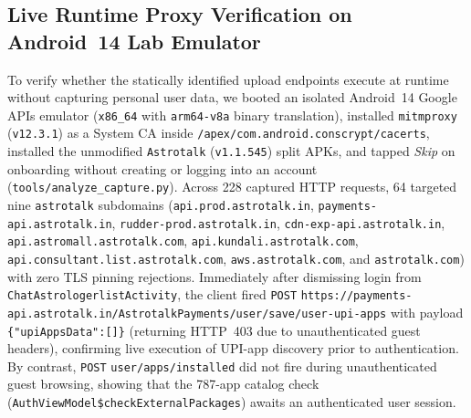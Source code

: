 \subsection{Live Runtime Proxy Verification on Android~14 Lab Emulator}
To verify whether the statically identified upload endpoints execute at runtime without capturing personal user data, we booted an isolated Android~14 Google APIs emulator (\texttt{x86\_64} with \texttt{arm64-v8a} binary translation), installed \texttt{mitmproxy} (\texttt{v12.3.1}) as a System CA inside \nolinkurl{/apex/com.android.conscrypt/cacerts}, installed the unmodified \texttt{Astrotalk} (\texttt{v1.1.545}) split APKs, and tapped \emph{Skip} on onboarding without creating or logging into an account (\nolinkurl{tools/analyze_capture.py}). Across 228 captured HTTP requests, 64 targeted nine \texttt{astrotalk} subdomains (\nolinkurl{api.prod.astrotalk.in}, \nolinkurl{payments-api.astrotalk.in}, \nolinkurl{rudder-prod.astrotalk.in}, \nolinkurl{cdn-exp-api.astrotalk.in}, \nolinkurl{api.astromall.astrotalk.com}, \nolinkurl{api.kundali.astrotalk.com}, \nolinkurl{api.consultant.list.astrotalk.com}, \nolinkurl{aws.astrotalk.com}, and \nolinkurl{astrotalk.com}) with zero TLS pinning rejections. Immediately after dismissing login from \texttt{ChatAstrologer\allowbreak listActivity}, the client fired \texttt{POST} \nolinkurl{https://payments-api.astrotalk.in/AstrotalkPayments/user/save/user-upi-apps} with payload \texttt{\{"upiAppsData":[]\}} (returning HTTP~403 due to unauthenticated guest headers), confirming live execution of UPI-app discovery prior to authentication. By contrast, \texttt{POST} \nolinkurl{user/apps/installed} did not fire during unauthenticated guest browsing, showing that the 787-app catalog check (\texttt{AuthViewModel\$\allowbreak checkExternalPackages}) awaits an authenticated user session.
